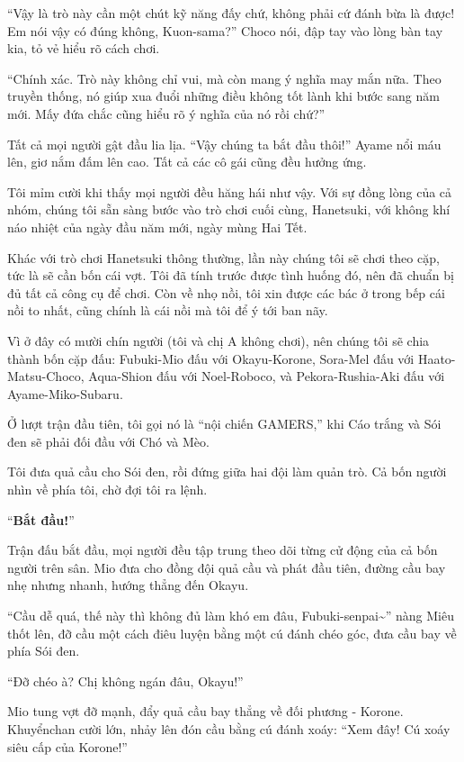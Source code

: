 \documentclass[../main.tex]{subfiles}
\begin{document}
``Vậy là trò này cần một chút kỹ năng đấy chứ, không phải cứ đánh bừa là được! Em nói vậy có đúng không, Kuon-sama?'' Choco nói, đập tay vào lòng bàn tay kia, tỏ vẻ hiểu rõ cách chơi.

``Chính xác. Trò này không chỉ vui, mà còn mang ý nghĩa may mắn nữa. Theo truyền thống, nó giúp xua đuổi những điều không tốt lành khi bước sang năm mới. Mấy đứa chắc cũng hiểu rõ ý nghĩa của nó rồi chứ?''

Tất cả mọi người gật đầu lia lịa. ``Vậy chúng ta bắt đầu thôi!'' Ayame nổi máu lên, giơ nắm đấm lên cao. Tất cả các cô gái cũng đều hưởng ứng.

Tôi mỉm cười khi thấy mọi người đều hăng hái như vậy. Với sự đồng lòng của cả nhóm, chúng tôi sẵn sàng bước vào trò chơi cuối cùng, Hanetsuki, với không khí náo nhiệt của ngày đầu năm mới, ngày mùng Hai Tết.

\ct

Khác với trò chơi Hanetsuki thông thường, lần này chúng tôi sẽ chơi theo cặp, tức là sẽ cần bốn cái vợt. Tôi đã tính trước được tình huống đó, nên đã chuẩn bị đủ tất cả công cụ để chơi. Còn về nhọ nồi, tôi xin được các bác ở trong bếp cái nồi to nhất, cũng chính là cái nồi mà tôi để ý tới ban nãy.

Vì ở đây có mười chín người (tôi và chị A không chơi), nên chúng tôi sẽ chia thành bốn cặp đấu: Fubuki-Mio đấu với Okayu-Korone, Sora-Mel đấu với Haato-Matsu-Choco, Aqua-Shion đấu với Noel-Roboco, và Pekora-Rushia-Aki đấu với Ayame-Miko-Subaru.

\il

Ở lượt trận đầu tiên, tôi gọi nó là ``nội chiến GAMERS,'' khi Cáo trắng và Sói đen sẽ phải đối đầu với Chó và Mèo.

Tôi đưa quả cầu cho Sói đen, rồi đứng giữa hai đội làm quản trò. Cả bốn người nhìn về phía tôi, chờ đợi tôi ra lệnh.

``\textbf{Bắt đầu!}''

Trận đấu bắt đầu, mọi người đều tập trung theo dõi từng cử động của cả bốn người trên sân. Mio đưa cho đồng đội quả cầu và phát đầu tiên, đường cầu bay nhẹ nhưng nhanh, hướng thẳng đến Okayu.

``Cầu dễ quá, thế này thì không đủ làm khó em đâu, Fubuki-senpai\~{}'' nàng Miêu thốt lên, đỡ cầu một cách điêu luyện bằng một cú đánh chéo góc, đưa cầu bay về phía Sói đen.

``Đỡ chéo à? Chị không ngán đâu, Okayu!''

Mio tung vợt đỡ mạnh, đẩy quả cầu bay thẳng về đối phương - Korone. Khuyểnchan cười lớn, nhảy lên đón cầu bằng cú đánh xoáy: ``Xem đây! Cú xoáy siêu cấp của Korone!''
\end{document}
